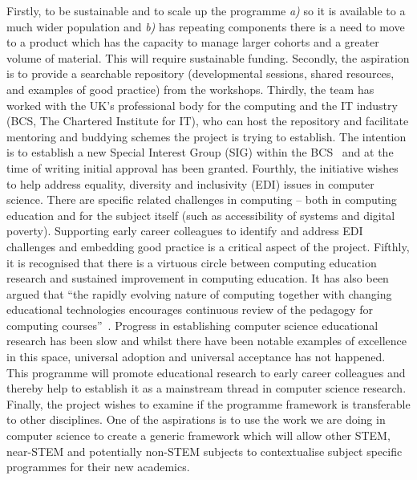 \documentclass[sigconf]{acmart}
\begin{document}
Firstly, to be sustainable and to scale up the programme {\emph{a)}}
so it is available to a much wider population and {\emph{b)}} has
repeating components there is a need to move to a product which has
the capacity to manage larger cohorts and a greater volume of
material. This will require sustainable funding. Secondly, the
aspiration is to provide a searchable repository (developmental
sessions, shared resources, and examples of good practice) from the
workshops. Thirdly, the team has worked with the UK's professional
body for the computing and the IT industry (BCS, The Chartered
Institute for IT), who can host the repository and facilitate
mentoring and buddying schemes the project is trying to establish. The
intention is to establish a new Special Interest Group (SIG) within
the BCS~\cite{BCSSIG} and at the time of writing initial approval has
been granted. Fourthly, the initiative wishes to help address
equality, diversity and inclusivity (EDI) issues in computer
science. There are specific
related challenges in computing -- both in computing education and for
the subject itself (such as accessibility of systems and digital
poverty). Supporting early career colleagues to identify and address
EDI challenges and embedding good practice is a critical aspect
of the project. Fifthly, it is recognised that there is a virtuous
circle between computing education research and sustained improvement
in computing education. It has also been argued that ``the rapidly
evolving nature of computing together with changing educational
technologies encourages continuous review of the pedagogy for
computing courses''~\cite{Iroms2004}. Progress in establishing
computer science educational research has been slow and whilst there
have been notable examples of excellence in this space, universal
adoption and universal acceptance has not happened. This programme
will promote educational research to early career colleagues and
thereby help to establish it as a mainstream thread in computer
science research. Finally, the project wishes to examine if the
programme framework is transferable to other disciplines. One of the
aspirations is to use the work we are doing in computer science to
create a generic framework which will allow other STEM, near-STEM and
potentially non-STEM subjects to contextualise subject specific
programmes for their new academics.
\end{document}
